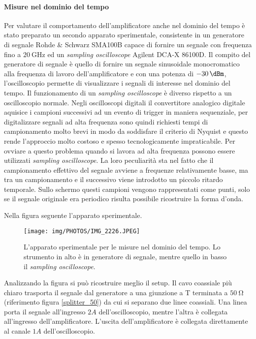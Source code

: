 \documentclass[12pt,oneside]{book}
\begin{document}
\paragraph{Misure nel dominio del tempo}
Per valutare il comportamento dell'amplificatore anche nel dominio del tempo è stato preparato un secondo apparato sperimentale, consistente in un generatore di segnale Rohde \& Schwarz SMA100B capace di fornire un segnale con frequenza fino a $\SI{20}{\giga\hertz}$ ed un \textit{sampling oscilloscope} Agilent DCA-X 86100D.
Il compito del generatore di segnale è quello di fornire un segnale sinusoidale monocromatico alla frequenza di lavoro dell'amplificatore e con una potenza di $\SI{-30}{\dBm}$, l'oscilloscopio permette di visualizzare i segnali di interesse nel dominio del tempo.
Il funzionamento di un \textit{sampling oscilloscope} è diverso rispetto a un oscilloscopio normale. Negli oscilloscopi digitali il convertitore analogico digitale aquisice i campioni successivi ad un evento di trigger in maniera sequenziale, per digitalizzare segnali ad alta frequenza sono quindi richiesti tempi di campionamento molto brevi in modo da soddisfare il criterio di Nyquist e questo rende l'approccio molto costoso e spesso tecnologicamente impraticabile. Per ovviare a questo problema quando si lavora ad alta frequenza possono essere utilizzati \textit{sampling oscilloscope}. La loro peculiarità sta nel fatto che il campionamento effettivo del segnale avviene a frequenze relativamente basse, ma tra un campionamento e il successivo viene introdotto un piccolo ritardo temporale. Sullo schermo questi campioni vengono rappresentati come punti, solo se il segnale originale era periodico risulta possibile ricostruire la forma d'onda.

Nella figura seguente l'apparato sperimentale. 
\begin{figure}[!htbp]
    \centering
        \texttt{[image: img/PHOTOS/IMG\_2226.JPEG]}
        \caption{L'apparato sperimentale per le misure nel dominio del tempo. Lo strumento in alto è in generatore di segnale, mentre quello in basso il \textit{sampling oscilloscope}.}
\end{figure}
Analizzando la figura si può ricostruire meglio il setup. Il cavo coassiale più chiaro trasporta il segnale dal generatore a una giunzione a T terminata a $\SI{50}{\ohm}$ (riferimento figura \ref{splitter_50}) da cui si separano due linee coassiali. Una linea porta il segnale all'ingresso $2A$ dell'oscilloscopio, mentre l'altra è collegata all'ingresso dell'amplificatore. L'uscita dell'amplificatore è collegata direttamente al canale $1A$ dell'oscilloscopio.
\end{document}
